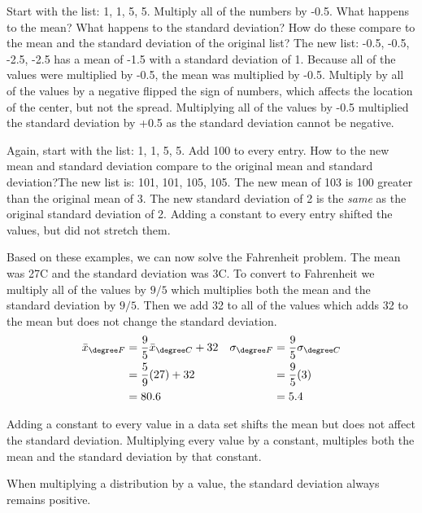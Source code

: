 {\begin{example}{Start with the list:  {1, 1, 5, 5}.  Multiply all of the numbers by -0.5.  What happens to the mean?  What happens to the standard deviation?  How do these compare to the mean and the standard deviation of the original list?} The new list: {-0.5, -0.5, -2.5, -2.5} has a mean of -1.5 with a standard deviation of 1.  Because all of the values were multiplied by -0.5, the mean was multiplied by -0.5.  Multiply by all of the values by a negative flipped the sign of numbers, which affects the location of the center, but not the spread.  Multiplying all of the values by -0.5 multiplied the standard deviation by +0.5 as the standard deviation cannot be negative.
\end{example}

\begin{example}{Again, start with the list: {1, 1, 5, 5}.  Add 100 to every entry.  How to the new mean and standard deviation compare to the original mean and standard deviation?}The new list is: {101, 101, 105, 105}.  The new mean of 103 is 100 greater than the original mean of 3.  The new standard deviation of 2 is the \emph{same} as the original standard deviation of 2.  Adding a constant to every entry shifted the values, but did not stretch them.
\end{example}

Based on these examples, we can now solve the Fahrenheit problem.  The mean was 27\degree C and the standard deviation was 3\degree C.  To convert to Fahrenheit we multiply all of the values by $9/5$ which multiplies both the mean and the standard deviation by $9/5$.  Then we add 32 to all of the values which adds 32 to the mean but does not change the standard deviation.  
\begin{align*}
\bar{x}_{\degree F} &= \frac{9}{5}\bar{x}_{\degree C} + 32 & \sigma_{\degree F} &= \frac{9}{5}\sigma_{\degree C} \\
&= \frac{5}{9}(27)+ 32 & &=\frac{9}{5}(3) \\
&=80.6 &  &=5.4 
\end{align*}
}

\begin{termBox}{
Adding a constant to every value in a data set shifts the mean but does not affect the standard deviation.  Multiplying every value by a constant, multiples both the mean and the standard deviation by that constant.  


When multiplying a distribution by a value, the standard deviation always remains positive.}
\end{termBox}

